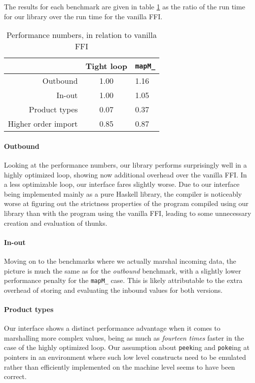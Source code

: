 \documentclass[preprint]{sigplanconf}
\begin{document}
The results for each benchmark are given in table \ref{tbl:performance} as
the ratio of the run time for our library over the run time for the vanilla
FFI.

\begin{table}
  \renewcommand{\arraystretch}{1.5}
  \begin{center}
    \begin{tabular}{|r|c|l|}
      \hline
                                   & Tight loop & \lstinline!mapM_! \\
      \hline
      Outbound                     & 1.00       & 1.16 \\
      \hline
      In-out                       & 1.00       & 1.05 \\
      \hline
      Product types                & 0.07       & 0.37 \\
      \hline
      Higher order import          & 0.85       & 0.87 \\
      \hline
    \end{tabular}
  \end{center}
  \caption{Performance numbers, in relation to vanilla FFI}
  \label{tbl:performance}
\end{table}

\paragraph{Outbound}
Looking at the performance numbers, our library performs surprisingly well in
a highly optimized loop, showing now additional overhead over the vanilla FFI.
In a less optimizable loop, our interface fares slightly worse.
Due to our interface being
implemented mainly as a pure Haskell library, the compiler is noticeably worse
at figuring out the strictness properties of the program compiled using our
library than with the program using the vanilla FFI, leading to some
unnecessary creation and evaluation of thunks.

\paragraph{In-out}
Moving on to the benchmarks where we actually marshal incoming data, the
picture is much the same as for the \emph{outbound} benchmark, with a slightly
lower performance penalty for the \lstinline!mapM_! case. This is likely
attributable to the extra overhead of storing and evaluating the inbound
values for both versions.

\paragraph{Product types}
Our interface shows a distinct performance advantage when it comes to
marshalling more complex values, being as much as \emph{fourteen times} faster
in the case of the highly optimized loop. Our assumption about
\lstinline!peek!ing and \lstinline!poke!ing at pointers in an environment where
such low level constructs need to be emulated rather than efficiently
implemented on the machine level seems to have been correct.
\end{document}
